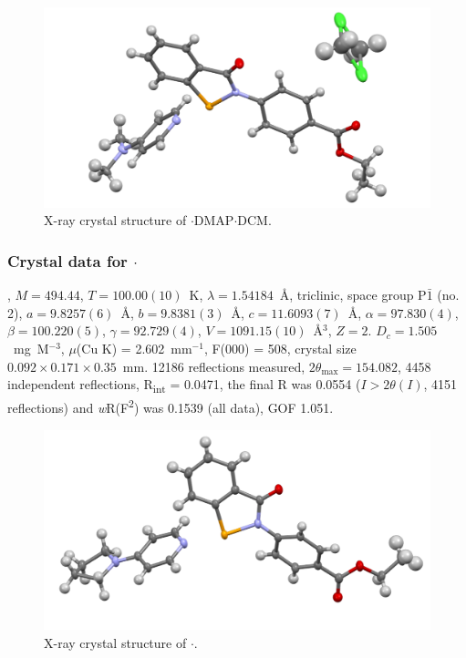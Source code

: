 \begin{refsection}
\begin{figure}
  \includegraphics[width=0.6\linewidth]{Figures/ebs-4co2et-dmap-dcm-xtal.pdf}
  \caption{X-ray crystal structure of \texorpdfstring{$\cdot$DMAP$\cdot$DCM}{C24 H25 Cl N3 O3 Se}.}
\end{figure}

\subsubsection{Crystal data for \texorpdfstring{$\cdot$}{C25 H25 N3 O3 Se}}
, $M=494.44$, $T=100.00(10)$~K, $\lambda=1.54184$~\AA, triclinic, space group P$\bar{1}$ (no. 2), $a = 9.8257(6)$~\AA, $b = 9.8381(3)$~\AA, $c = 11.6093(7)$~\AA, $\alpha = 97.830(4)$\degree, $\beta = 100.220(5)$\degree, $\gamma = 92.729(4)$\degree, $V = 1091.15(10)$~\AA$^{3}$, $Z = 2$. $D_{c}= 1.505$~mg~M$^{-3}$, $\mu$(Cu K\a) = 2.602~mm$^{-1}$, F(000) = 508, crystal size $0.092 \times 0.171 \times 0.35$~mm. 12186 reflections measured, $2\theta_{\mathrm{max}}=154.082$\degree, 4458 independent reflections, R\textsubscript{int} = 0.0471, the final R was 0.0554 ($I > 2\theta(I)$, 4151 reflections) and \emph{w}R(F\textsuperscript{2}) was 0.1539 (all data), GOF 1.051.

\begin{figure}
  \includegraphics[width=0.6\linewidth]{Figures/ebs-4co2et-pyrrol-xtal.pdf}
  \caption{X-ray crystal structure of \texorpdfstring{$\cdot$}{C25 H25 N3 O3 Se}.}
\end{figure}


\end{refsection}

